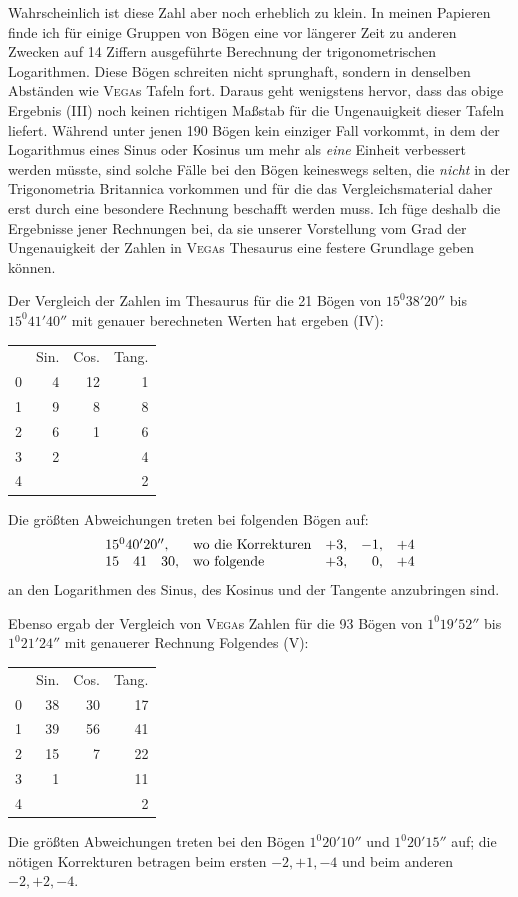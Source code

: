 Wahrscheinlich ist diese Zahl aber noch erheblich zu klein. In meinen Papieren finde ich für einige Gruppen von Bögen eine vor längerer Zeit zu anderen Zwecken auf 14 Ziffern ausgeführte Berechnung der trigonometrischen Logarithmen. Diese Bögen schreiten nicht sprunghaft, sondern in denselben Abständen wie \textsc{Vega}s Tafeln fort. Daraus geht wenigstens hervor, dass das obige Ergebnis (III) noch keinen richtigen Maßstab für die Ungenauigkeit dieser Tafeln liefert. Während unter jenen 190 Bögen kein einziger Fall vorkommt, in dem der Logarithmus eines Sinus oder Kosinus um mehr als \textit{eine} Einheit verbessert werden müsste, sind solche Fälle bei den Bögen keineswegs selten, die \textit{nicht} in der Trigonometria Britannica vorkommen und für die das Vergleichsmaterial daher erst durch eine besondere Rechnung beschafft werden muss. Ich füge deshalb die Ergebnisse jener Rechnungen bei, da sie unserer Vorstellung vom Grad der Ungenauigkeit der Zahlen in \textsc{Vega}s Thesaurus eine festere Grundlage geben können.
\par
{}
Der Vergleich der Zahlen im Thesaurus für die 21 Bögen von $15^{0}38'20''$ bis $15^{0}41'40''$ mit genauer berechneten Werten hat ergeben (IV):
\begin{center}\begin{tabular}{r r r r}
& Sin. & Cos. & Tang.\\
0&4&12&1\\
1&9&8&8\\
2&6&1&6\\
3&2&&4\\
4&&&2
\end{tabular}\end{center}
Die größten Abweichungen treten bei folgenden Bögen auf:
\[
\begin{array}{l l r r r}
15^{0}40'20'',&\text{wo die Korrekturen}&+3,&-1,&+4\\
15\quad41\quad30,&\text{wo folgende}&+3,&0,&+4
\end{array}
\]
an den Logarithmen des Sinus, des Kosinus und der Tangente anzubringen sind.

Ebenso ergab der Vergleich von \textsc{Vega}s Zahlen für die 93 Bögen von $1^{0}19'52''$ bis $1^{0}21'24''$ mit genauerer Rechnung Folgendes (V):
\begin{center}\begin{tabular}{r r r r}
& Sin. & Cos. & Tang.\\
0&38&30&17\\
1&39&56&41\\
2&15&7&22\\
3&1&&11\\
4&&&2
\end{tabular}\end{center}
Die größten Abweichungen treten bei den Bögen $1^{0}20'10''$ und $1^{0}20'15''$ auf; die nötigen Korrekturen betragen beim ersten $-2,+1,-4$ und beim anderen $-2,+2,-4$.

